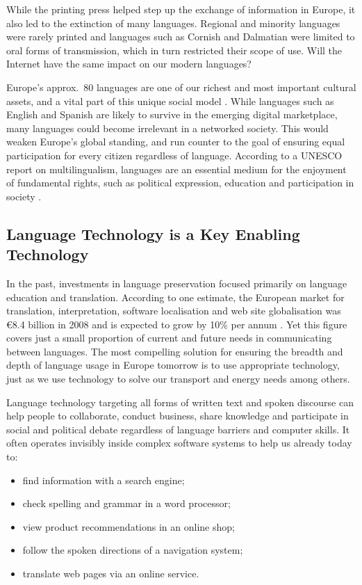 \begin{multicols}{2}
While the printing press helped step up the exchange of information in Europe, it also led to the extinction of many languages. Regional and minority languages were rarely printed and languages such as Cornish and Dalmatian were limited to oral forms of transmission, which in turn restricted their scope of use. Will the Internet have the same impact on our modern languages?


Europe’s approx.~80 languages are one of our richest and most important cultural assets, and a vital part of this unique social model \cite{EC2}. While languages such as English and Spanish are likely to survive in the emerging digital marketplace, many languages could become irrelevant in a networked society. This would weaken Europe’s global standing, and run counter to the goal of ensuring equal participation for every citizen regardless of language. According to a UNESCO report on multilingualism, languages are an essential medium for the enjoyment of fundamental rights, such as political expression, education and participation in society \cite{Unesco1}.

\subsection{Language Technology is a Key Enabling Technology}

In the past, investments in language preservation focused primarily on language education and translation. According to one estimate, the European market for translation, interpretation, software localisation and web site globalisation was €8.4 billion in 2008 and is expected to grow by 10\% per annum \cite{EC3}. Yet this figure covers just a small proportion of current and future needs in communicating between languages. The most compelling solution for ensuring the breadth and depth of language usage in Europe tomorrow is to use appropriate technology, just as we use technology to solve our transport and energy needs among others.

Language technology targeting all forms of written text and spoken discourse can help people to collaborate, conduct business, share knowledge and participate in social and political debate regardless of language barriers and computer skills. It often operates invisibly inside complex software systems to help us already today to:

\begin{itemize}
\item find information with a search engine;
\item check spelling and grammar in a word processor;
\item view product recommendations in an online shop;
\item follow the spoken directions of a navigation system;
\item translate web pages via an online service.
\end{itemize}


\end{multicols}
